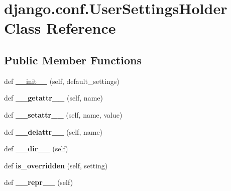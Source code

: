 \hypertarget{classdjango_1_1conf_1_1_user_settings_holder}{}\section{django.\+conf.\+User\+Settings\+Holder Class Reference}
\label{classdjango_1_1conf_1_1_user_settings_holder}
\subsection*{Public Member Functions}
\begin{DoxyCompactItemize}
\item 
def \mbox{\hyperlink{classdjango_1_1conf_1_1_user_settings_holder_a3941aa8a3dfa09eaedf88bdf0e00f08f}{\+\_\+\+\_\+init\+\_\+\+\_\+}} (self, default\+\_\+settings)
\item 
\mbox{\label{classdjango_1_1conf_1_1_user_settings_holder_a8d5091e594c7905eb8db3f8a1d93dd2b}} 
def {\bfseries \+\_\+\+\_\+getattr\+\_\+\+\_\+} (self, name)
\item 
\mbox{\label{classdjango_1_1conf_1_1_user_settings_holder_a3a981b179932e647c109d6bc9bd129a6}} 
def {\bfseries \+\_\+\+\_\+setattr\+\_\+\+\_\+} (self, name, value)
\item 
\mbox{\label{classdjango_1_1conf_1_1_user_settings_holder_a58e930e316e33651818bb97020a8c99d}} 
def {\bfseries \+\_\+\+\_\+delattr\+\_\+\+\_\+} (self, name)
\item 
\mbox{\label{classdjango_1_1conf_1_1_user_settings_holder_a36bd6f5bde7f6153c1b13fc9f12435ad}} 
def {\bfseries \+\_\+\+\_\+dir\+\_\+\+\_\+} (self)
\item 
\mbox{\label{classdjango_1_1conf_1_1_user_settings_holder_aae5379c02ddf00634431bdcdf8da3d73}} 
def {\bfseries is\+\_\+overridden} (self, setting)
\item 
\mbox{\label{classdjango_1_1conf_1_1_user_settings_holder_a92b345f950091d2a8ef3375706a189c1}} 
def {\bfseries \+\_\+\+\_\+repr\+\_\+\+\_\+} (self)
\end{DoxyCompactItemize}
